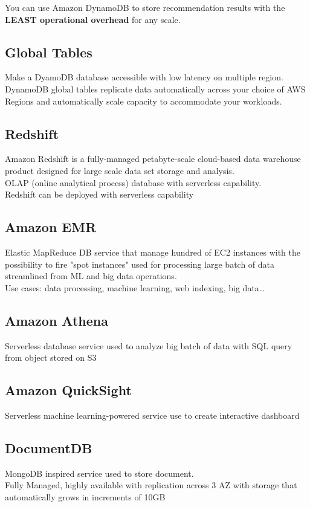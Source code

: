 \documentclass[12pt, letterpaper, twoside]{article}
\begin{document}
You can use Amazon DynamoDB to store recommendation results with the \textbf{LEAST operational overhead} for any scale.

\subsection{Global Tables}
Make a DyamoDB database accessible with low latency on multiple region.\\
DynamoDB global tables replicate data automatically across your choice of AWS Regions and automatically scale capacity 
to accommodate your workloads. 


\subsection{Redshift}
Amazon Redshift is a fully-managed petabyte-scale cloud-based data warehouse product designed for large scale data 
set storage and analysis.\\
OLAP (online analytical process) database with serverless capability.\\
Redshift can be deployed with serverless capability

\subsection{Amazon EMR}
Elastic MapReduce DB service that manage hundred of EC2 instances with the possibility to fire "spot instances" 
used for processing large batch of data streamlined from ML and big data operations.\\
Use cases: data processing, machine learning, web indexing, big data…

\subsection{Amazon Athena}
Serverless database service used to analyze big batch of data with SQL query from object stored on S3

\subsection{Amazon QuickSight}
Serverless machine learning-powered service use to create interactive dashboard 

\subsection{DocumentDB}
MongoDB inspired service used to store document.\\
Fully Managed, highly available with replication across 3 AZ with storage that automatically grows in increments of 10GB
\end{document}
